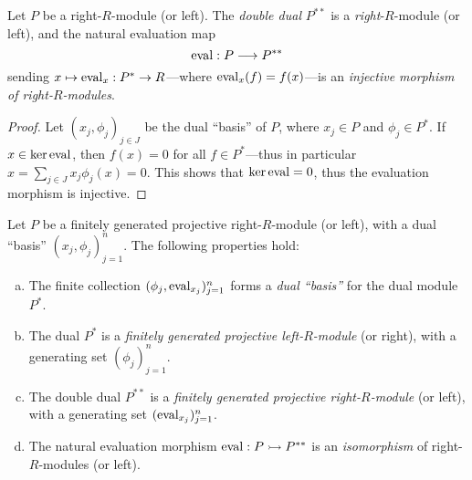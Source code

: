 \begin{proposition}
\label{prop:projective-module-evaluation-morphism-is-injective}
Let \(P\) be a right-\(R\)-module (or left). The \emph{double dual} \(P^{* *}\)
is a \emph{right}-\(R\)-module (or left), and the natural evaluation map
\[
\operatorname{eval}: P \longrightarrow P^{* *}
\]
sending \(x \mapsto \operatorname{eval}_x: P^{*} \to R\)---where \(\operatorname{eval}_x(f) = f(x)\)---is an
\emph{injective morphism of right-\(R\)-modules}.
\end{proposition}

\begin{proof}
Let \((x_j, \phi_j)_{j \in J}\) be the dual ``basis'' of \(P\), where
\(x_j \in P\) and \(\phi_j \in P^{*}\). If \(x \in \ker \operatorname{eval}\), then
\(f(x) = 0\) for all \(f \in P^{*}\)---thus in particular \(x = \sum_{j \in J}
x_j \phi_j(x) = 0\). This shows that \(\ker \operatorname{eval} = 0\), thus the evaluation
morphism is injective.
\end{proof}

\begin{proposition}
\label{prop:properties-of-fg-proj-modules-and-duals}
Let \(P\) be a finitely generated projective right-\(R\)-module (or left), with
a dual ``basis'' \((x_j, \phi_j)_{j=1}^n\). The following properties hold:
\begin{enumerate}[(a)]\setlength\itemsep{0em}
\item The finite collection \((\phi_j, \operatorname{eval}_{x_j})_{j=1}^n\) forms a \emph{dual
  ``basis''} for the dual module \(P^{*}\).
\item The dual \(P^{*}\) is a \emph{finitely generated projective
    left-\(R\)-module} (or right), with a generating set \((\phi_j)_{j=1}^n\).
\item The double dual \(P^{* *}\) is a \emph{finitely generated projective
    right-\(R\)-module} (or left), with a generating set
  \((\operatorname{eval}_{x_j})_{j=1}^n\).
\item The natural evaluation morphism \(\operatorname{eval}: P \rightarrowtail P^{* *}\) is an
  \emph{isomorphism} of right-\(R\)-modules (or left).
\end{enumerate}
\end{proposition}

